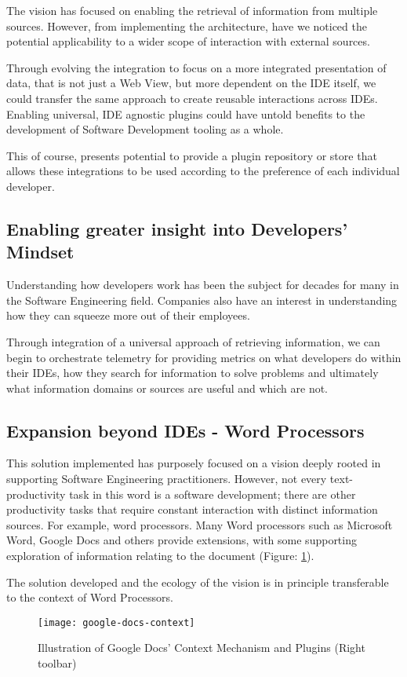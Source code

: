 The vision has focused on enabling the retrieval of information from multiple sources. However, from implementing the architecture, have we noticed the potential applicability to a wider scope of interaction with external sources.

Through evolving the integration to focus on a more integrated presentation of data, that is not just a Web View, but more dependent on the IDE itself, we could transfer the same approach to create reusable interactions across IDEs. Enabling universal, IDE agnostic plugins could have untold benefits to the development of Software Development tooling as a whole. 

This of course, presents potential to provide a plugin repository or store that allows these integrations to be used according to the preference of each individual developer.

\subsection{Enabling greater insight into Developers' Mindset}

Understanding how developers work has been the subject for decades for many in the Software Engineering field. Companies also have an interest in understanding how they can squeeze more out of their employees.

Through integration of a universal approach of retrieving information, we can begin to orchestrate telemetry for providing metrics on what developers do within their IDEs, how they search for information to solve problems and ultimately what information domains or sources are useful and which are not. 

\subsection{Expansion beyond IDEs - Word Processors}

This solution implemented has purposely focused on a vision deeply rooted in supporting Software Engineering practitioners. However, not every text-productivity task in this word is a software development; there are other productivity tasks that require constant interaction with distinct information sources. For example, word processors. Many Word processors such as Microsoft Word, Google Docs and others provide extensions, with some supporting exploration of information relating to the document (Figure: \ref{fig:google-docs-context}). 

The solution developed and the ecology of the vision is in principle transferable to the context of Word Processors.

\begin{figure}[h!]
	\centering
	\texttt{[image: google-docs-context]}
	\caption{Illustration of Google Docs' Context Mechanism and Plugins (Right toolbar)}
	\label{fig:google-docs-context}
\end{figure}

